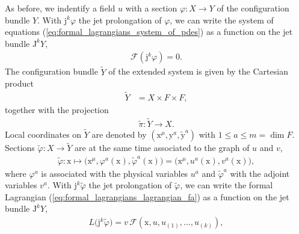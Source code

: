 \documentclass[12pt,a4paper,reqno]{article}
\begin{document}
As before, we indentify a field ${\ensuremath{{\ensuremath{{u}}}}}$ with a section ${\ensuremath{\varphi}} : X \rightarrow Y$ of the configuration bundle $Y$.
With ${\ensuremath{\mathrm{j}}}^{k} {\ensuremath{\varphi}}$ the jet prolongation of ${\ensuremath{\varphi}}$, we can write the system of equations (\ref{eq:formal_lagrangians_system_of_pdes}) as a function on the jet bundle ${\ensuremath{\mathrm{J}}}^{k} Y$,
\begin{align}
\mathcal{F} ({\ensuremath{\mathrm{j}}}^{k} {\ensuremath{\varphi}}) = 0 .
\end{align}
The configuration bundle $\tilde{Y}$ of the extended system is given by the Cartesian product
\begin{align}
\tilde{Y} &
= X \times F \times F ,
\end{align}
together with the projection
\begin{align}
\tilde{\pi} : \tilde{Y} \rightarrow X .
\end{align}
Local coordinates on $\tilde{Y}$ are denoted by $( {\ensuremath{{\ensuremath{\mathrm{{x}}}}}}^{\mu}, {\ensuremath{{\ensuremath{\mathrm{{y}}}}}}^{a}, \tilde{\ensuremath{{\ensuremath{\mathrm{{y}}}}}}^{a} )$ with $1 \leq a \leq m = \dim F$.
Sections $\tilde{\ensuremath{\varphi}} : X \rightarrow \tilde{Y}$ are at the same time associated to the graph of ${\ensuremath{{\ensuremath{{u}}}}}$ and ${\ensuremath{{\ensuremath{{v}}}}}$,
\begin{align}
\tilde{\ensuremath{\varphi}} : {\ensuremath{{\ensuremath{\mathrm{{x}}}}}} \mapsto \big( {\ensuremath{{\ensuremath{\mathrm{{x}}}}}}^{\mu} , {\ensuremath{\varphi}}^{a} ({\ensuremath{{\ensuremath{\mathrm{{x}}}}}}) , \tilde{\ensuremath{\varphi}}^{a} ({\ensuremath{{\ensuremath{\mathrm{{x}}}}}}) \big)
= \big( {\ensuremath{{\ensuremath{\mathrm{{x}}}}}}^{\mu} , {\ensuremath{{\ensuremath{{u}}}}}^{a} ({\ensuremath{{\ensuremath{\mathrm{{x}}}}}}) , {\ensuremath{{\ensuremath{{v}}}}}^{a} ({\ensuremath{{\ensuremath{\mathrm{{x}}}}}}) \big) ,
\end{align}
where ${\ensuremath{\varphi}}^{a}$ is associated with the physical variables ${\ensuremath{{\ensuremath{{u}}}}}^{a}$ and $\tilde{\ensuremath{\varphi}}^{a}$ with the adjoint variables ${\ensuremath{{\ensuremath{{v}}}}}^{a}$.
With ${\ensuremath{\mathrm{j}}}^{k} \tilde{\ensuremath{\varphi}}$ the jet prolongation of $\tilde{\ensuremath{\varphi}}$, we can write the formal Lagrangian (\ref{eq:formal_lagrangians_lagrangian_fa}) as a function on the jet bundle ${\ensuremath{\mathrm{J}}}^{k} Y$,
\begin{align}\label{eq:formal_lagrangians_geometric_lagrangian}
L \big( {\ensuremath{\mathrm{j}}}^{k} \tilde{\ensuremath{\varphi}} \big) = {\ensuremath{{\ensuremath{{v}}}}} \, \mathcal{F} ({\ensuremath{{\ensuremath{\mathrm{{x}}}}}}, {\ensuremath{{\ensuremath{{u}}}}}, {\ensuremath{{\ensuremath{{u}}}}}_{(1)}, ..., {\ensuremath{{\ensuremath{{u}}}}}_{(k)}) ,
\end{align}
\end{document}
